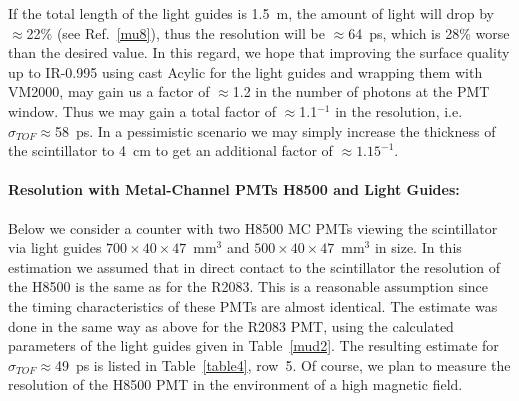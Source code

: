 If the total length of the light guides is 1.5~m, the amount of light will 
drop by $\approx$22\% (see Ref.~\ref{mu8}), thus the resolution will be 
$\approx$64~ps, which is 28\% worse than the desired value.  In this
regard, we hope that improving the surface quality up to IR-0.995 using  
cast Acylic for the light guides and wrapping them with VM2000, may gain us
a factor of $\approx$1.2 in the number of photons at the PMT window.
Thus we may gain a total factor of $\approx$1.1$^{-1}$ in the resolution, 
i.e. $\sigma_{TOF}\approx$58~ps.  In a pessimistic scenario we may 
simply increase the thickness of the scintillator to 4~cm to get an 
additional factor of $\approx1.15^{-1}$.

\paragraph{Resolution with Metal-Channel PMTs H8500 and Light Guides:}

Below we consider a counter with two H8500 MC PMTs viewing the scintillator 
via light guides $700 \times 40 \times 47$~mm$^3$ and 
$500 \times 40 \times 47$~mm$^3$ in size.  In this estimation we assumed 
that in direct contact to the scintillator the resolution of the H8500 is 
the same as for the R2083.  This is a reasonable assumption since the timing 
characteristics of these PMTs are almost identical.  The estimate was done 
in the same way as above for the R2083 PMT, using the calculated parameters 
of the light guides given in Table~\ref{mud2}.  The resulting estimate for 
$\sigma_{TOF}\approx$49~ps is listed in Table~\ref{table4}, row~5.  Of 
course, we plan to measure the resolution of the H8500 PMT in the environment 
of a high magnetic field.

